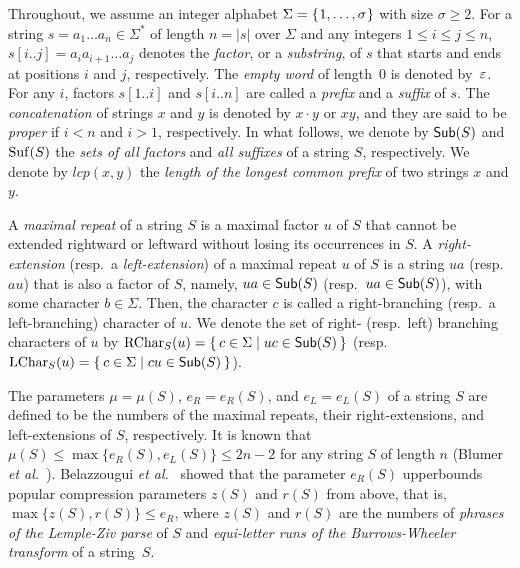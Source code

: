 \documentclass{article}
\begin{document}
Throughout, we assume an integer alphabet $\Sigma = \{\kern0.05em1, \dots, \sigma\kern0.05em\}$ with size $\sigma \ge 2$. 
For a string $s = a_1\dots a_n \in \Sigma^*$ of length $n = |s|$ over $\Sigma$ and any integers $1\le i\le j\le n$, $s[i..j] = a_i a_{i+1}\dots a_j$ denotes the \textit{factor}, or a \textit{substring}, of $s$ that starts and ends at positions $i$ and $j$, respectively. The \textit{empty word} of length~$0$ is denoted by~$\varepsilon$. For any $i$, factors $s[1..i]$ and $s[i..n]$ are called a \textit{prefix} and a \textit{suffix} of $s$. The \textit{concatenation} of strings $x$ and $y$ is denoted by $x\cdot y$ or $xy$, and they are said to be \textit{proper} if $i < n$ and $i > 1$, respectively. 
In what follows, we denote by $\mathsf{Sub}(S)$ and $\mathrm{Suf}(S)$ the \textit{sets of all factors} and \textit{all suffixes} of a string $S$, respectively. We denote by $lcp(x, y)$ the \textit{length of the longest common prefix} of two strings $x$ and $y$. 

A \textit{maximal repeat} of a string $S$ is a maximal factor $u$ of $S$ that cannot be extended rightward or leftward without losing its occurrences in $S$. A \textit{right-extension} (resp.~a \textit{left-extension}) of a maximal repeat $u$ of $S$ is a string $ua$ (resp.~$au$) that is also a factor of $S$, namely, $ua \in \mathsf{Sub}(S)$ (resp.~$ua \in \mathsf{Sub}(S)$), with some character $b \in \Sigma$. Then, the character $c$ is called a right-branching (resp.~a left-branching) character of $u$. We denote the set of right- (resp.~left) branching characters of $u$ by $\mathrm{RChar}_{S}(u) = \{\kern0.2em c \in \Sigma \mid uc \in \mathsf{Sub}(S) \kern0.2em\}$ (resp.~$\mathrm{LChar}_{S}(u) = \{\kern0.2em c \in \Sigma \mid cu \in \mathsf{Sub}(S) \kern0.2em\}$). 

The parameters $\mu = \mu(S)$, $e_R = e_R(S)$, and $e_L = e_L(S)$ of a string $S$ are defined to be the numbers of the maximal repeats, their right-extensions, and left-extensions of $S$, respectively. It is known that $\mu(S) \le \max\{e_R(S), e_L(S)\} \le 2n - 2$ for any string $S$ of length $n$ (Blumer \textit{et al.}~\cite{blumer1987complete}).
Belazzougui \textit{et al.}~\cite{belazzougui:nunial:gagie:prezza:raffinot2015composite} showed that the parameter $e_R(S)$ upperbounds popular compression parameters $z(S)$ and $r(S)$ from above, that is, $\max\{z(S), r(S)\} \le e_R$, where $z(S)$ and $r(S)$ are the numbers of \textit{phrases of the Lemple-Ziv parse} of $S$ and \textit{equi-letter runs of the Burrows-Wheeler transform} of a string~$S$. 
\end{document}
